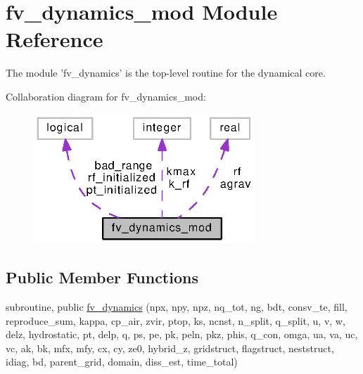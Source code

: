 \section{fv\-\_\-dynamics\-\_\-mod Module Reference}
\label{classfv__dynamics__mod}


The module 'fv\-\_\-dynamics' is the top-\/level routine for the dynamical core.  




Collaboration diagram for fv\-\_\-dynamics\-\_\-mod\-:
\nopagebreak
\begin{figure}[H]
\begin{center}
\leavevmode
\includegraphics[width=235pt]{classfv__dynamics__mod__coll__graph}
\end{center}
\end{figure}
\subsection*{Public Member Functions}
\begin{DoxyCompactItemize}
\item 
subroutine, public \hyperlink{classfv__dynamics__mod_a57030300ce6aacf81a3588faf906f07f}{fv\-\_\-dynamics} (npx, npy, npz, nq\-\_\-tot, ng, bdt, consv\-\_\-te, fill, reproduce\-\_\-sum, kappa, cp\-\_\-air, zvir, ptop, ks, ncnst, n\-\_\-split, q\-\_\-split, u, v, w, delz, hydrostatic, pt, delp, q, ps, pe, pk, peln, pkz, phis, q\-\_\-con, omga, ua, va, uc, vc, ak, bk, mfx, mfy, cx, cy, ze0, hybrid\-\_\-z, gridstruct, flagstruct, neststruct, idiag, bd, parent\-\_\-grid, domain, diss\-\_\-est, time\-\_\-total)
\end{DoxyCompactItemize}
